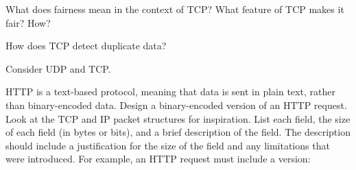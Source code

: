 \documentclass[
  addpoints, answers]{exam}
\begin{document}
\begin{questions}
\newpage


\question[2] What does fairness mean in the context of TCP? What feature of TCP makes it fair? How?

\begin{solution}
\end{solution}


\question[1] How does TCP detect duplicate data?

\begin{solution}
\end{solution}


\newpage


\question[3] Consider UDP and TCP.





\newpage


\question[10] HTTP is a text-based protocol, meaning that data is sent in plain text, rather than binary-encoded data. Design a binary-encoded version of an HTTP request. Look at the TCP and IP packet structures for inspiration. List each field, the size of each field (in bytes or bits), and a brief description of the field. The description should include a justification for the size of the field and any limitations that were introduced. For example, an HTTP request must include a version:


\end{questions}
\end{document}
